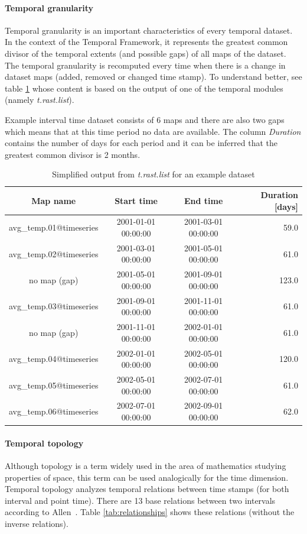 \documentclass[a4paper,12pt,oneside]{book}
\newcommand{\module}[1]{\textsl{#1}}
\newcommand{\tf}{Temporal Framework\xspace}
\begin{document}
\paragraph{Temporal granularity}
\label{sec:temporalGranularity}
Temporal granularity is an important characteristics of every temporal dataset.
In the context of the \tf , it represents the greatest common divisor
of the temporal extents (and possible gaps) of all maps of the dataset.
The temporal granularity is recomputed every time when there is a change in dataset maps
(added, removed or changed time stamp).
To understand better, see table \ref{tab:granularity} whose content is based on the output
of one of the temporal modules (namely \module{t.rast.list}).

Example interval time dataset consists of 6 maps and
there are also two gaps which means that at this time period no data are available.
The column \emph{Duration} contains the number of days for each period and it can be inferred
that the greatest common divisor is 2 months.
\begin{table}[ht!]
  \centering
  \small
  \caption{Simplified output from \module{t.rast.list} for an example dataset}
  \label{tab:granularity}
\setlength{\extrarowheight}{3pt}
\begin{tabular}{cccr}
\toprule
 Map name & Start time & End time & Duration [days]\\\midrule
avg\_temp.01@timeseries &    2001-01-01 00:00:00  &   2001-03-01 00:00:00  &   59.0\\
avg\_temp.02@timeseries  &  2001-03-01 00:00:00  &   2001-05-01 00:00:00   &  61.0\\
no map (gap)    &  2001-05-01 00:00:00    & 2001-09-01 00:00:00   &  123.0\\
avg\_temp.03@timeseries     & 2001-09-01 00:00:00   &  2001-11-01 00:00:00  &   61.0\\
no map (gap) &   2001-11-01 00:00:00   &  2002-01-01 00:00:00  &   61.0 \\
avg\_temp.04@timeseries  &    2002-01-01 00:00:00   &  2002-05-01 00:00:00     & 120.0 \\
avg\_temp.05@timeseries  &      2002-05-01 00:00:00 &    2002-07-01 00:00:00 &    61.0 \\
avg\_temp.06@timeseries &     2002-07-01 00:00:00  &   2002-09-01 00:00:00   &  62.0\\
\bottomrule
\end{tabular}
\end{table}


\paragraph{Temporal topology}
\label{sec:temporalTopology}
Although topology is a term widely used in the area of mathematics studying properties of space,
this term can be used analogically for the time dimension.
Temporal topology analyzes temporal relations between time stamps (for both interval and point time).
There are 13 base relations between two intervals according to Allen~\cite{relationships}.
Table \ref{tab:relationships} shows these relations (without the inverse relations).
\end{document}
